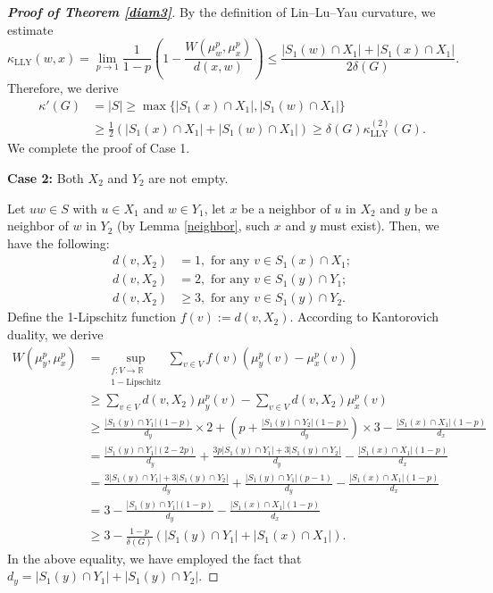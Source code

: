 \documentclass[10pt,a4paper]{article}
\theoremstyle{definition}
\theoremstyle{definition}
\theoremstyle{nonumber}
\begin{document}
\begin{proof}[\bf{Proof of Theorem \ref{diam3}}]
By the definition of Lin--Lu--Yau curvature, we estimate
$$
\kappa_{\mathrm{LLY}}(w, x) = \lim_{p \to 1} \frac{1}{1-p} \left( 1 - \frac{W(\mu_w^p, \mu_x^p)}{d(x, w)} \right) \leq \frac{|S_1(w) \cap X_1| + |S_1(x) \cap X_1|}{2\delta(G)}.
$$
Therefore, we derive
\begin{align*}
\kappa'(G) &= |S| \geq \max\{|S_1(x) \cap X_1|, |S_1(w) \cap X_1|\}\\
&\geq \frac{1}{2} (|S_1(x) \cap X_1| + |S_1(w) \cap X_1|) \geq \delta(G) \kappa_{\mathrm{LLY}}^{(2)}(G).
\end{align*}
We complete the proof of Case 1.

\textbf{Case 2:} Both $X_2$ and $Y_2$ are not empty.

Let $uw \in S$ with $u\in X_1$ and $w\in Y_1$,  let $x$ be a neighbor of $u$ in $X_2$ and $y$ be a neighbor of $w$ in $Y_2$ (by Lemma \ref{neighbor}, such $x$ and $y$ must exist). Then, we have the following:
\begin{align*} 
d(v, X_2) &= 1, \text{ for any } v \in S_1(x) \cap X_1;\\
d(v, X_2) &= 2, \text{ for any } v \in S_1(y) \cap Y_1;\\
d(v, X_2) &\geq 3, \text{ for any } v \in S_1(y) \cap Y_2.
\end{align*}
Define the 1-Lipschitz function $f(v):=d(v, X_2)$. According to Kantorovich duality, we derive
\begin{align*}
W(\mu_y^p, \mu_x^p) &= \sup_{\substack{f: V \to \mathbb{R} \\ 1-\text{Lipschitz}}} \sum_{v \in V} f(v) \left( \mu_y^p(v) - \mu_x^p(v) \right)\\
&\geq \sum_{v \in V} d(v, X_2) \mu_y^p(v) - \sum_{v \in V} d(v, X_2) \mu_x^p(v)\\
&\geq \frac{|S_1(y) \cap Y_1|(1-p)}{d_y}\times 2 + \left( p + \frac{|S_1(y) \cap Y_2|(1-p)}{d_y} \right) \times 3 - \frac{|S_1(x) \cap X_1|(1-p)}{d_x}\\
&= \frac{|S_1(y) \cap Y_1|(2-2p)}{d_y} +  \frac{3p|S_1(y) \cap Y_1|+3|S_1(y) \cap Y_2|}{d_y} - \frac{|S_1(x) \cap X_1|(1-p)}{d_x}\\
&= \frac{3|S_1(y) \cap Y_1|+3|S_1(y) \cap Y_2|}{d_y} +  \frac{|S_1(y) \cap Y_1|(p-1)}{d_y} - \frac{|S_1(x) \cap X_1|(1-p)}{d_x}\\
&= 3 - \frac{|S_1(y) \cap Y_1|(1-p)}{d_y} - \frac{|S_1(x) \cap X_1|(1-p)}{d_x}\\
&\geq 3 - \frac{1-p}{\delta(G)} \left( |S_1(y) \cap Y_1| + |S_1(x) \cap X_1| \right).
\end{align*}
In the above equality, we have employed the fact that $d_y = |S_1(y) \cap Y_1| + |S_1(y) \cap Y_2|$.


\end{proof}
\end{document}

